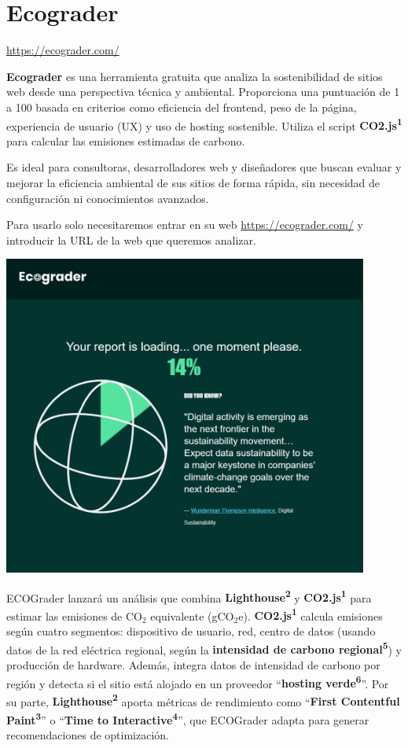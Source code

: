 \documentclass[12pt,a4paper]{report}
\begin{document}
\section*{\textbf{Ecograder}}

\url{https://ecograder.com/}

\textbf{Ecograder} es una herramienta gratuita que analiza la sostenibilidad de sitios web desde una perspectiva técnica y ambiental. Proporciona una puntuación de 1 a 100 basada en criterios como eficiencia del frontend, peso de la página, experiencia de usuario (UX) y uso de hosting sostenible. Utiliza el script \textbf{CO2.js\textsuperscript{1}} para calcular las emisiones estimadas de carbono.

Es ideal para consultoras, desarrolladores web y diseñadores que buscan evaluar y mejorar la eficiencia ambiental de sus sitios de forma rápida, sin necesidad de configuración ni conocimientos avanzados.

Para usarlo solo necesitaremos entrar en su web \url{https://ecograder.com/} y introducir la URL de la web que queremos analizar.

\begin{center}
    \includegraphics[width=0.9\textwidth]{imagenes/Ecograder_1.png}
\end{center}

ECOGrader lanzará un análisis que combina \textbf{Lighthouse\textsuperscript{2}} y \textbf{CO2.js\textsuperscript{1}} para estimar las emisiones de CO$_2$ equivalente (gCO$_2$e). \textbf{CO2.js\textsuperscript{1}} calcula emisiones según cuatro segmentos: dispositivo de usuario, red, centro de datos (usando datos de la red eléctrica regional, según la \textbf{intensidad de carbono regional\textsuperscript{5}}) y producción de hardware. Además, integra datos de intensidad de carbono por región y detecta si el sitio está alojado en un proveedor “\textbf{hosting verde\textsuperscript{6}}”. Por su parte, \textbf{Lighthouse\textsuperscript{2}} aporta métricas de rendimiento como “\textbf{First Contentful Paint\textsuperscript{3}}” o “\textbf{Time to Interactive\textsuperscript{4}}”, que ECOGrader adapta para generar recomendaciones de optimización.
\end{document}
